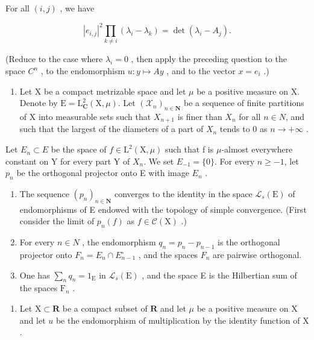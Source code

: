 For all \((i,j)\) , we have

\[
\left| e _ {i, j} \right| ^ {2} \prod_ {k \neq i} \left(\lambda_ {i} - \lambda_ {k}\right) = \det \left(\lambda_ {i} - A _ {j}\right).
\]

(Reduce to the case where \(\lambda_{i}=0\) , then apply the preceding question to the space \(C^{n}\) , to the endomorphism \(u\colon y\mapsto Ay\) , and to the vector \(x=e_{i}\) .)

\begin{enumerate}
\def\labelenumi{\arabic{enumi})}
\setcounter{enumi}{17}
\tightlist
\item
  Let X be a compact metrizable space and let \(\mu\) be a positive measure on X. Denote by \(\mathrm{E} = \mathrm{L}_{\mathbf{C}}^{2}(\mathrm{X}, \mu)\). Let \((\mathcal{X}_{n})_{n \in \mathbf{N}}\) be a sequence of finite partitions of X into measurable sets such that \(X_{n+1}\) is finer than \(X_{n}\) for all \(n \in N\), and such that the largest of the diameters of a part of \(X_{n}\) tends to 0 as \(n \to +\infty\) .
\end{enumerate}

Let \(E_{n} \subset E\) be the space of \(f \in \mathrm{L}^{2}(\mathrm{X}, \mu)\) such that f is \(\mu\)-almost everywhere constant on Y for every part Y of \(X_{n}\). We set \(E_{-1} = \{0\}\). For every \(n \geqslant -1\), let \(p_{n}\) be the orthogonal projector onto E with image \(E_{n}\) .

\begin{enumerate}
\def\labelenumi{\alph{enumi})}
\item
  The sequence \((p_{n})_{n\in\mathbf{N}}\) converges to the identity in the space \(\mathcal{L}_{s}(\mathrm{E})\) of endomorphisms of E endowed with the topology of simple convergence. (First consider the limit of \(p_{n}(f)\) as \(f\in\mathcal{C}(\mathrm{X})\) .)
\item
  For every \(n \in N\) , the endomorphism \(q_{n} = p_{n} - p_{n-1}\) is the orthogonal projector onto \(F_{n} = E_{n} \cap E_{n-1}^{\circ}\) , and the spaces \(F_{n}\) are pairwise orthogonal.
\item
  One has \(\sum_{n} q_{n} = 1_{\mathrm{E}}\) in \(\mathcal{L}_s(\mathrm{E})\) , and the space E is the Hilbertian sum of the spaces \(\mathrm{F}_n\) .
\end{enumerate}

\begin{enumerate}
\def\labelenumi{\arabic{enumi})}
\setcounter{enumi}{18}
\tightlist
\item
  Let \(\mathrm{X} \subset \mathbf{R}\) be a compact subset of \(\mathbf{R}\) and let \(\mu\) be a positive measure on \(\mathrm{X}\) and let \(u\) be the endomorphism of multiplication by the identity function of \(\mathrm{X}\) .
\end{enumerate}

